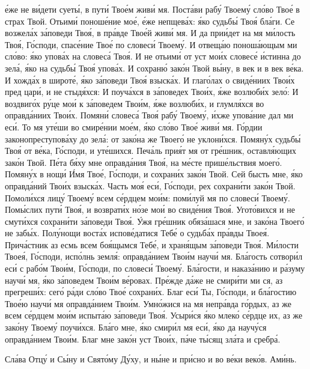 е́же не ви́дети суеты́, в пути́ Твое́м живи́ мя. Поста́ви рабу́ Твоему́
сло́во Твое́ в страх Твой. Отьими́ поноше́ние мое́, е́же непщева́х: я́ко
судьбы́ Твоя́ бла́ги. Се возжела́х за́поведи Твоя́, в пра́вде Твое́й живи́
мя. И да прии́дет на мя ми́лость Твоя́, Го́споди, спасе́ние Твое́ по
словеси́ Твоему́. И отвеща́ю поноша́ющым ми сло́во: я́ко упова́х на
словеса́ Твоя́. И не отьими́ от уст мои́х словесе́ и́стинна до зела́, я́ко
на судьбы́ Твоя́ упова́х. И сохраню́ зако́н Твой вы́ну, в век и в век
ве́ка. И хожда́х в широте́, я́ко за́поведи Твоя́ взыска́х. И глаго́лах о
свиде́ниих Твои́х пред цари́, и не стыдя́хся: И поуча́хся в за́поведех Твои́х,
я́же возлюби́х зело́: И воздвиго́х ру́це мои́ к за́поведем Твои́м, я́же
возлюби́х, и глумля́хся во оправда́ниих Твои́х. Помяни́ словеса́ Твоя́ рабу́
Твоему́, и́хже упова́ние дал ми еси́. То мя уте́ши во смире́нии мое́м, я́ко
сло́во Твое́ живи́ мя. Го́рдии законопреступова́ху до зела́: от зако́на
же Твоего́ не уклони́хся. Помяну́х судьбы́ Твоя́ от ве́ка, Го́споди, и
уте́шихся. Печа́ль прия́т мя от гре́шник, оставля́ющих зако́н Твой. Пе́та
бя́ху мне оправда́ния Твоя́, на ме́сте прише́льствия моего́. Помяну́х в
нощи́ И́мя Твое́, Го́споди, и сохрани́х зако́н Твой. Сей бысть мне, я́ко
оправда́ний Твои́х взыска́х. Часть моя́ еси́, Го́споди, рех сохрани́ти
зако́н Твой. Помоли́хся лицу́ Твоему́ всем се́рдцем мои́м: поми́луй мя
по словеси́ Твоему́. Помы́слих пути́ Твоя́, и возврати́х но́зе мои́ во
свиде́ния Твоя́. Угото́вихся и не смути́хся сохрани́ти за́поведи Твоя́.
У́жя гре́шник обяза́шася мне, и зако́на Твоего́ не забы́х. Полу́нощи
воста́х испове́датися Тебе́ о судьба́х пра́вды Твоея́. Прича́стник аз есмь
всем боя́щымся Тебе́, и храня́щым за́поведи Твоя́. Ми́лости Твоея́,
Го́споди, испо́лнь земля́: оправда́нием Твои́м научи́ мя. Бла́гость
сотвори́л еси́ с рабо́м Твои́м, Го́споди, по словеси́ Твоему́. Бла́гости, и
наказа́нию и ра́зуму научи́ мя, я́ко за́поведем Твои́м ве́ровах. Пре́жде
да́же не смири́ти ми ся, аз прегреши́х: сего́ ра́ди сло́во Твое́ сохрани́х.
Благ еси́ Ты, Го́споди, и бла́гостию Твое́ю научи́ мя оправда́нием
Твои́м. Умно́жися на мя непра́вда го́рдых, аз же всем се́рдцем мои́м
испыта́ю за́поведи Твоя́. Усыри́ся я́ко млеко́ се́рдце их, аз же зако́ну
Твоему́ поучи́хся. Бла́го мне, я́ко смири́л мя еси́, я́ко да научу́ся
оправда́нием Твои́м. Благ мне зако́н уст Твои́х, па́че ты́сящ зла́та и
сребра́.
   


   Сла́ва Отцу́ и Сы́ну и Свято́му Ду́ху, и ны́не и при́сно и во ве́ки веко́в.
Ами́нь.


